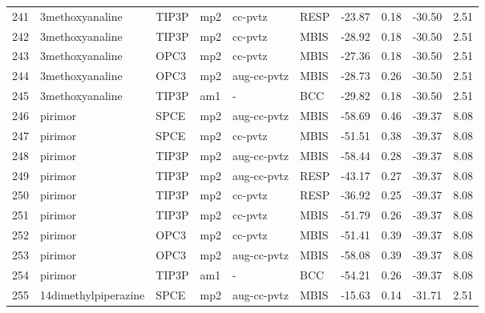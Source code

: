 \begin{tabular}{llllllrrrr}
241 &                3methoxyanaline &      TIP3P &      mp2 &      cc-pvtz &         RESP & -23.87 &      0.18 &      -30.50 &     2.51 \\
242 &                3methoxyanaline &      TIP3P &      mp2 &      cc-pvtz &         MBIS & -28.92 &      0.18 &      -30.50 &     2.51 \\
243 &                3methoxyanaline &       OPC3 &      mp2 &      cc-pvtz &         MBIS & -27.36 &      0.18 &      -30.50 &     2.51 \\
244 &                3methoxyanaline &       OPC3 &      mp2 &  aug-cc-pvtz &         MBIS & -28.73 &      0.26 &      -30.50 &     2.51 \\
245 &                3methoxyanaline &      TIP3P &      am1 &            - &          BCC & -29.82 &      0.18 &      -30.50 &     2.51 \\
246 &                        pirimor &       SPCE &      mp2 &  aug-cc-pvtz &         MBIS & -58.69 &      0.46 &      -39.37 &     8.08 \\
247 &                        pirimor &       SPCE &      mp2 &      cc-pvtz &         MBIS & -51.51 &      0.38 &      -39.37 &     8.08 \\
248 &                        pirimor &      TIP3P &      mp2 &  aug-cc-pvtz &         MBIS & -58.44 &      0.28 &      -39.37 &     8.08 \\
249 &                        pirimor &      TIP3P &      mp2 &  aug-cc-pvtz &         RESP & -43.17 &      0.27 &      -39.37 &     8.08 \\
250 &                        pirimor &      TIP3P &      mp2 &      cc-pvtz &         RESP & -36.92 &      0.25 &      -39.37 &     8.08 \\
251 &                        pirimor &      TIP3P &      mp2 &      cc-pvtz &         MBIS & -51.79 &      0.26 &      -39.37 &     8.08 \\
252 &                        pirimor &       OPC3 &      mp2 &      cc-pvtz &         MBIS & -51.41 &      0.39 &      -39.37 &     8.08 \\
253 &                        pirimor &       OPC3 &      mp2 &  aug-cc-pvtz &         MBIS & -58.08 &      0.39 &      -39.37 &     8.08 \\
254 &                        pirimor &      TIP3P &      am1 &            - &          BCC & -54.21 &      0.26 &      -39.37 &     8.08 \\
255 &           14dimethylpiperazine &       SPCE &      mp2 &  aug-cc-pvtz &         MBIS & -15.63 &      0.14 &      -31.71 &     2.51 \\

\end{tabular}
